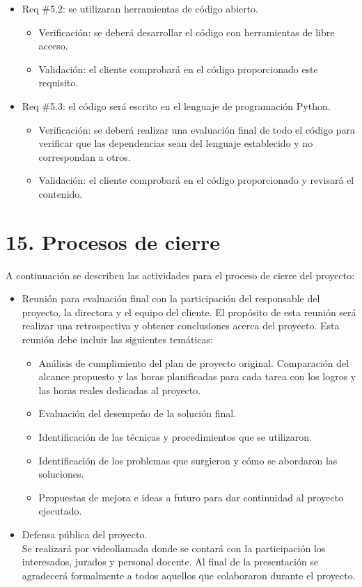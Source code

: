 \documentclass[
11pt, %
]{charter}
\begin{document}
\begin{itemize}
\item Req \#5.2: se utilizaran herramientas de código abierto.
\begin{itemize}
	\item Verificación: se deberá desarrollar el código con herramientas de libre acceso.
	\item Validación: el cliente comprobará en el código proporcionado este requisito.
\end{itemize}

\item Req \#5.3: el código será escrito en el lenguaje de programación Python.
\begin{itemize}
	\item Verificación: se deberá realizar una evaluación final de todo el código para verificar que las dependencias
	sean del lenguaje establecido y no correspondan a otros.
	\item Validación: el cliente comprobará en el código proporcionado y revisará el contenido.
\end{itemize}

\end{itemize}



\section{15. Procesos de cierre}    
\label{sec:cierre}

A continuación se describen las actividades para el proceso de cierre del proyecto:
\begin{itemize}
\item Reunión para evaluación final con la participación del responsable del proyecto, la directora y el equipo
del cliente. El propósito de esta reunión será realizar una retrospectiva y obtener conclusiones 
acerca del proyecto. Esta reunión debe incluir las siguientes temáticas:
    
\begin{itemize}
        \item Análisis de cumplimiento del plan de proyecto original. Comparación del alcance
        propuesto y las horas planificadas para cada tarea con los logros y las horas reales
        dedicadas al proyecto.
        \item Evaluación del desempeño de la solución final.
        \item Identificación de las técnicas y procedimientos que se utilizaron.
        \item Identificación de los problemas que surgieron y cómo se abordaron las soluciones.
        \item Propuestas de mejora e ideas a futuro para dar continuidad al proyecto ejecutado. 
\end{itemize}

\item Defensa pública del proyecto. \\
Se realizará por videollamada donde se contará con la participación los interesados, jurados y personal
docente. Al final de la presentación se agradecerá formalmente a todos aquellos que
colaboraron durante el proyecto.
\end{itemize}
\end{document}
